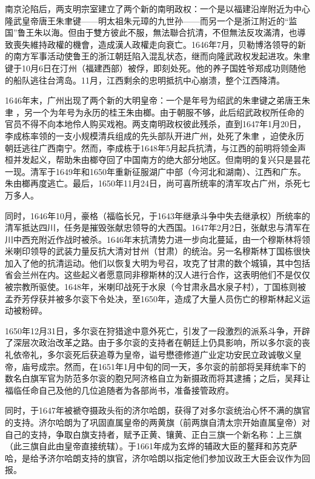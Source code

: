 南京沦陷后，两支明宗室建立了两个新的南明政权：一个是以福建沿岸附近为中心隆武皇帝唐王朱聿键——明太祖朱元璋的九世孙——而另一个是浙江附近的“监国”鲁王朱以海。但由于雙方彼此不服，無法聯合抗清，不但無法反攻滿清，也導致喪失維持政權的機會，造成漢人政權走向衰亡。1646年7月，贝勒博洛领导的新的南方军事活动使鲁王的浙江朝廷陷入混乱状态，继而向隆武政权发起进攻。朱聿键于10月6日在汀州（福建西部）被俘，即刻处死。他的养子国姓爷郑成功则随他的船队逃往台湾岛。11月，江西剩余的忠明抵抗中心崩溃，整个江西降清。

1646年末，广州出现了两个新的大明皇帝：一个是年号为绍武的朱聿键之弟唐王朱聿𨮁，另一个为年号为永历的桂王朱由榔。由于朝服不够，此后绍武政权所任命的官员不得不向本地伶人购买戏袍。两支南明政权彼此残杀，直到1647年1月20日，李成栋率领的一支小规模清兵组成的先头部队开进广州，处死了朱聿𨮁，迫使永历朝廷逃往广西南宁。然而，李成栋于1648年5月起兵抗清，与江西的前明将领金声桓并发起义，帮助朱由榔夺回了中国南方的绝大部分地区。但南明的复兴只是昙花一现。清军于1649年和1650年重新征服湖广中部（今河北和湖南）、江西和广东。朱由榔再度逃亡。最后，1650年11月24日，尚可喜所统率的清军攻占广州，杀死七万多人。

同时，1646年10月，豪格（福临长兄，于1643年继承斗争中失去继承权）所统率的清军抵达四川，任务是摧毁张献忠领导的大西国。1647年2月2日，张献忠与清军在川中西充附近作战时被杀。1646年末抗清势力进一步向北蔓延，由一个穆斯林将领米喇印领导的武装力量反抗大清对甘州（甘肃）的统治。另一名穆斯林丁国栋很快加入了他的抗清运动。他们以恢复大明为号召，攻克了甘肃的数个城镇，其中包括省会兰州在内。这些起义者愿意同非穆斯林的汉人进行合作，这表明他们不是仅仅被宗教所驱使。1648年，米喇印战死于水泉（今甘肃永昌水泉子村），丁国栋则被孟乔芳俘获并被多尔衮下令处决，至1650年，造成了大量人员伤亡的穆斯林起义运动被粉碎。

1650年12月31日，多尔衮在狩猎途中意外死亡，引发了一段激烈的派系斗争，开辟了深层次政治改革之路。由于多尔衮的支持者在朝廷上仍具影响，所以多尔衮的丧礼依帝礼，多尔衮死后获追尊为皇帝，谥号懋德修道广业定功安民立政诚敬义皇帝，庙号成宗。然而，在1651年1月中旬的同一天，多尔衮的前部将吴拜统率下的数名白旗军官为防范多尔衮的胞兄阿济格自立为新摄政而将其逮捕；之后，吴拜让福临任命自己及他的几位追随者为各部尚书，准备接管政府。

同时，于1647年被褫夺摄政头衔的济尔哈朗，获得了对多尔衮统治心怀不满的旗官的支持。济尔哈朗为了巩固直属皇帝的两黄旗（前两旗自清太宗开始直属皇帝）对自己的支持，争取白旗支持者，赋予正黄、镶黄、正白三旗一个新名称：上三旗（此三旗自此由皇帝直接统辖）。于1661年成为玄烨的辅政大臣的鳌拜和苏克萨哈，是给予济尔哈朗支持的旗官，济尔哈朗以指定他们参加议政王大臣会议作为回报。

